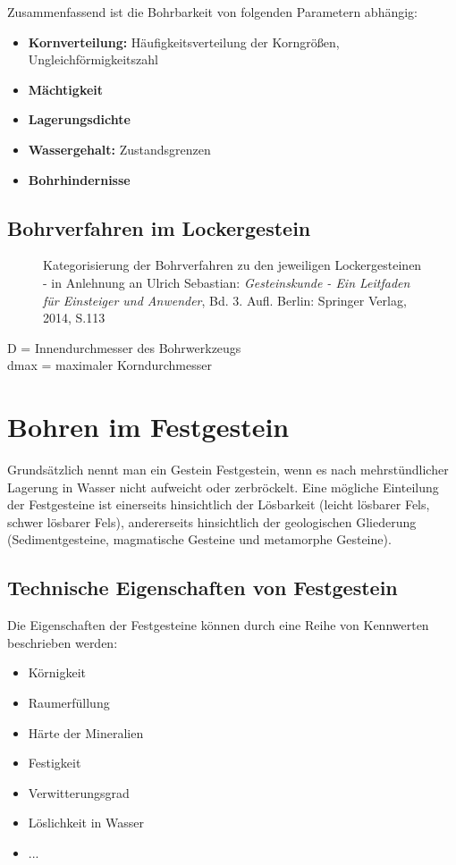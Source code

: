 \documentclass[12pt,a4paper,draft]{scrartcl} %
\begin{document}
Zusammenfassend ist die Bohrbarkeit von folgenden Parametern abhängig:

\begin{itemize}
\item \textbf{Kornverteilung:} Häufigkeitsverteilung der Korngrößen, Ungleichförmigkeitszahl
\item \textbf{Mächtigkeit}
\item \textbf{Lagerungsdichte}
\item \textbf{Wassergehalt:} Zustandsgrenzen
\item \textbf{Bohrhindernisse}

\end{itemize}

\subsection{Bohrverfahren im Lockergestein}

\begin{figure}[H]
\caption{Kategorisierung der Bohrverfahren zu den jeweiligen Lockergesteinen - in Anlehnung an Ulrich Sebastian: \emph{Gesteinskunde - Ein Leitfaden für Einsteiger und Anwender}, Bd. 3. Aufl. Berlin: Springer Verlag, 2014, S.113}
\label{fig: Bohrbarkeit_Lockergestein}
\end{figure}

D = Innendurchmesser des Bohrwerkzeugs\\
dmax = maximaler Korndurchmesser

\section{Bohren im Festgestein}
Grundsätzlich nennt man ein Gestein Festgestein, wenn es nach mehrstündlicher Lagerung in Wasser nicht aufweicht oder zerbröckelt. Eine mögliche Einteilung der Festgesteine ist einerseits hinsichtlich der Lösbarkeit (leicht lösbarer Fels, schwer lösbarer Fels), andererseits hinsichtlich der geologischen Gliederung (Sedimentgesteine, magmatische Gesteine und metamorphe Gesteine).

\subsection{Technische Eigenschaften von Festgestein}
Die Eigenschaften der Festgesteine können durch eine Reihe von Kennwerten beschrieben werden:

\begin{itemize}
\item Körnigkeit
\item Raumerfüllung
\item Härte der Mineralien
\item Festigkeit
\item Verwitterungsgrad
\item Löslichkeit in Wasser
\item ...
\end{itemize}
\end{document}
